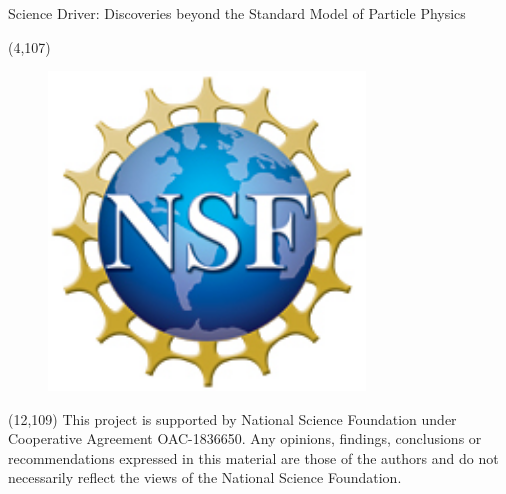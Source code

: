 \documentclass[final]{beamer}
\begin{document}
\begin{frame}{}
\begin{textblock}{80.0}
\begin{block}{Science Driver: Discoveries beyond the Standard Model of Particle Physics}
\end{block}
\end{textblock}



\begin{textblock}{8.0}(4,107)
\begin{figure}[tbph]
\centering
\includegraphics[width=0.75\textwidth]{images/nsf1.jpg}
\end{figure}
\end{textblock}


\begin{textblock}{70.0}(12,109)
This project is supported by National Science Foundation under Cooperative Agreement OAC-1836650. Any opinions, findings, conclusions or recommendations expressed in this material are those of the authors and do not necessarily reflect the views of the National Science Foundation.
\end{textblock}




\end{frame}
\end{document}
